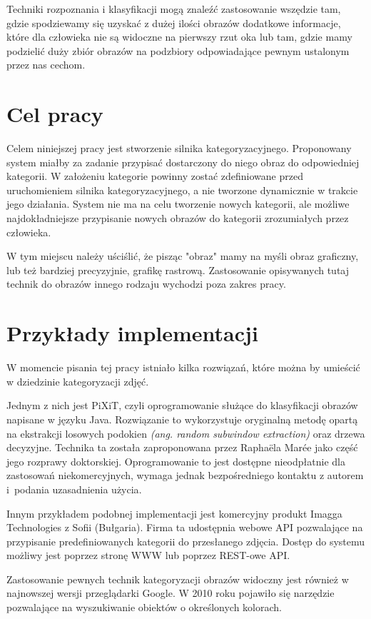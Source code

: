 Techniki rozpoznania i klasyfikacji mogą znaleźć zastosowanie wszędzie tam, gdzie spodziewamy się uzyskać z dużej ilości obrazów dodatkowe informacje, które dla człowieka nie są widoczne na pierwszy rzut oka lub tam, gdzie mamy podzielić duży zbiór obrazów na podzbiory odpowiadające pewnym ustalonym przez nas cechom.


\section*{Cel pracy}
Celem niniejszej pracy jest stworzenie silnika kategoryzacyjnego. Proponowany system miałby za zadanie przypisać dostarczony do niego obraz do odpowiedniej kategorii. W założeniu kategorie powinny zostać zdefiniowane przed uruchomieniem silnika kategoryzacyjnego, a nie tworzone dynamicznie w trakcie jego działania. System nie ma na celu tworzenie nowych kategorii, ale możliwe najdokładniejsze przypisanie nowych obrazów do kategorii zrozumiałych przez człowieka.

W tym miejscu należy uściślić, że pisząc "obraz" mamy na myśli obraz graficzny, lub też bardziej precyzyjnie, grafikę rastrową. Zastosowanie opisywanych tutaj technik do obrazów innego rodzaju wychodzi poza zakres pracy.

\section*{Przykłady implementacji}
W momencie pisania tej pracy istniało kilka rozwiązań, które można by umieścić w dziedzinie kategoryzacji zdjęć.

Jednym z nich jest PiXiT, czyli oprogramowanie służące do klasyfikacji obrazów napisane w języku Java. Rozwiązanie to wykorzystuje oryginalną metodę opartą na ekstrakcji losowych podokien \emph{(ang. random subwindow extraction)} oraz drzewa decyzyjne. Technika ta została zaproponowana przez Raphaëla Marée jako część jego rozprawy doktorskiej. Oprogramowanie to jest dostępne nieodpłatnie dla zastosowań niekomercyjnych, wymaga jednak bezpośredniego kontaktu z autorem i~podania uzasadnienia użycia\cite{PIXIT}.

Innym przykładem podobnej implementacji jest komercyjny produkt Imagga Technologies z Sofii (Bułgaria). Firma ta udostępnia webowe API pozwalające na przypisanie predefiniowanych kategorii do przesłanego zdjęcia. Dostęp do systemu możliwy jest poprzez stronę WWW lub poprzez REST-owe API\cite{IMAGGA}.

Zastosowanie pewnych technik kategoryzacji obrazów widoczny jest również w najnowszej wersji przeglądarki Google. W 2010 roku pojawiło się narzędzie pozwalające na wyszukiwanie obiektów o określonych kolorach\cite{Google2010}.


